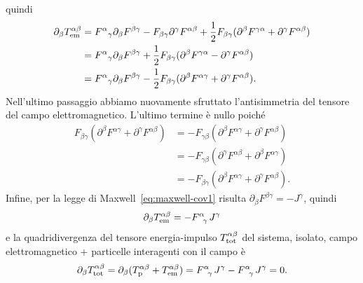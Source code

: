 quindi
\begin{equation}
  \begin{split}
    \partial_{\beta}T_{\textup{em}}^{\alpha\beta} &=
    \tensor{F}{^{\alpha}}_{\gamma}\partial_{\beta}F^{\beta\gamma}
    -F_{\beta\gamma} \partial^{\gamma} F^{\alpha\beta} +
    \frac{1}{2}F_{\beta\gamma}(\partial^{\beta}F^{\gamma\alpha}
    + \partial^{\gamma}F^{\alpha\beta}) \\
    &= \tensor{F}{^{\alpha}}_{\gamma}\partial_{\beta}F^{\beta\gamma} +
    \frac{1}{2}F_{\beta\gamma}(\partial^{\beta}F^{\gamma\alpha}
    - \partial^{\gamma}F^{\alpha\beta}) \\
    &= \tensor{F}{^{\alpha}}_{\gamma}\partial_{\beta}F^{\beta\gamma} -
    \frac{1}{2}F_{\beta\gamma}(\partial^{\beta}F^{\alpha\gamma}
    + \partial^{\gamma}F^{\alpha\beta}).
  \end{split}
\end{equation}
Nell'ultimo passaggio abbiamo nuovamente sfruttato l'antisimmetria del tensore
del campo elettromagnetico.  L'ultimo termine è nullo poiché
\begin{equation}
  \begin{split}
    F_{\beta\gamma}(\partial^{\beta}F^{\alpha\gamma}
    + \partial^{\gamma}F^{\alpha\beta}) &=
    -F_{\gamma\beta}(\partial^{\beta}F^{\alpha\gamma}
    + \partial^{\gamma}F^{\alpha\beta}) \\
    &= -F_{\gamma\beta}(\partial^{\gamma}F^{\alpha\beta}
    + \partial^{\beta}F^{\alpha\gamma}) \\
    &= -F_{\beta\gamma}(\partial^{\beta}F^{\alpha\gamma}
    + \partial^{\gamma}F^{\alpha\beta}).
  \end{split}
\end{equation}
Infine, per la legge di Maxwell~\eqref{eq:maxwell-cov1} risulta
$\partial_{\beta}F^{\beta\gamma} = -J^{\gamma}$, quindi
\begin{equation}
  \partial_{\beta}T_{\textup{em}}^{\alpha\beta} =
  -\tensor{F}{^{\alpha}_{\gamma}}J^{\gamma}
\end{equation}
e la quadridivergenza del tensore energia-impulso
$T_{\textup{tot}}^{\alpha\beta}$ del sistema, isolato, campo elettromagnetico +
particelle interagenti con il campo è
\begin{equation}
  \partial_{\beta}T_{\textup{tot}}^{\alpha\beta}
  = \partial_{\beta}(T_{\textup{p}}^{\alpha\beta} +
  T_{\textup{em}}^{\alpha\beta}) = \tensor{F}{^{\alpha}_{\gamma}}J^{\gamma} -
  \tensor{F}{^{\alpha}_{\gamma}}J^{\gamma} = 0.
\end{equation}

